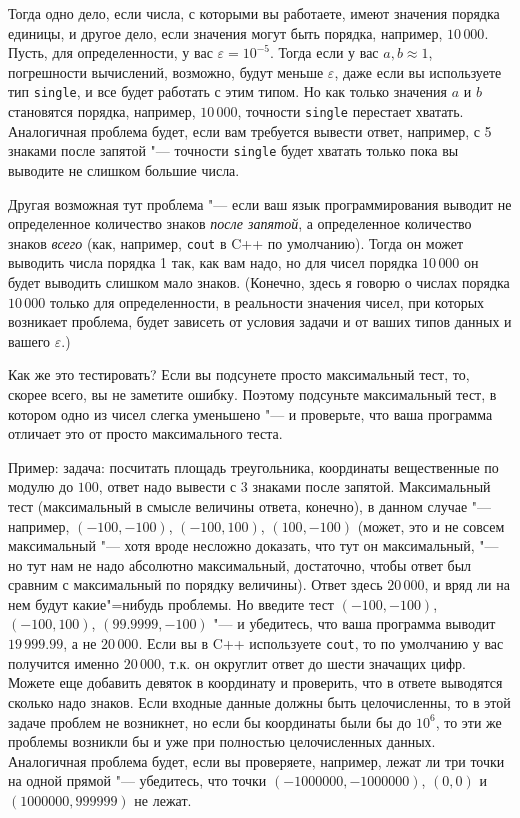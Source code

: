 \documentclass[a4paper,10pt]{problems}
\begin{document}
Тогда одно дело, если числа, с которыми вы работаете, имеют значения порядка единицы, 
и другое дело, если значения могут быть порядка, например, $10\,000$. 
Пусть, для определенности, у вас $\varepsilon=10^{-5}$. Тогда если у вас $a,b\approx 1$,
погрешности вычислений, возможно, будут меньше $\varepsilon$, даже если вы используете
тип \verb`single`, и все будет работать с этим типом. 
Но как только значения $a$ и $b$ становятся порядка, например, $10\,000$, 
точности \verb`single` перестает хватать. 
Аналогичная проблема будет, если вам требуется вывести ответ, например, с 5 знаками после запятой
"--- точности \verb`single` будет хватать только пока вы выводите не слишком большие числа.

Другая возможная тут проблема "--- если ваш язык программирования выводит
не определенное количество знаков \textit{после запятой}, а определенное количество
знаков \textit{всего} (как, например, \verb`cout` в C++ по умолчанию).
Тогда он может выводить числа порядка 1 так, как вам надо, но для чисел порядка $10\,000$ 
он будет выводить слишком мало знаков. (Конечно, здесь я говорю о числах порядка $10\,000$
только для определенности, в реальности значения чисел, при которых возникает проблема,
будет зависеть от условия задачи и от ваших типов данных и вашего $\varepsilon$.)

Как же это тестировать? Если вы подсунете просто максимальный тест, то, скорее всего, 
вы не заметите ошибку. Поэтому подсуньте максимальный тест, в котором одно из чисел
слегка уменьшено "--- и проверьте, что ваша программа отличает это от просто максимального теста.

Пример: задача: посчитать площадь треугольника, координаты вещественные по модулю до $100$, 
ответ надо вывести с 3 знаками после запятой. Максимальный тест (максимальный в смысле 
величины ответа, конечно), в данном случае "--- например, 
$(-100,-100)$, $(-100,100)$, $(100,-100)$ (может, это и не совсем максимальный "--- хотя вроде несложно доказать,
что тут он максимальный, "--- но тут нам не надо абсолютно максимальный, достаточно,
чтобы ответ был сравним с максимальный по порядку величины). Ответ здесь $20\,000$,
и вряд ли на нем будут какие"=нибудь проблемы.
Но введите тест $(-100,-100)$, $(-100,100)$, $(99.9999,-100)$ "--- и убедитесь,
что ваша программа выводит $19\,999.99$, а не $20\,000$. 
Если вы в C++ используете \verb`cout`, то по умолчанию у вас получится именно $20\,000$,
т.к. он округлит ответ до шести значащих цифр.
Можете еще добавить девяток в координату и проверить, что в ответе выводятся сколько надо знаков.
Если входные данные должны быть целочисленны, то в этой задаче проблем не возникнет,
но если бы координаты были бы до $10^6$, то эти же проблемы возникли бы и уже при полностью 
целочисленных данных. Аналогичная проблема будет, если вы проверяете, например, лежат ли
три точки на одной прямой "--- убедитесь, что точки $(-1000000,-1000000)$, $(0,0)$ и $(1000000,999999)$
не лежат.
\end{document}
